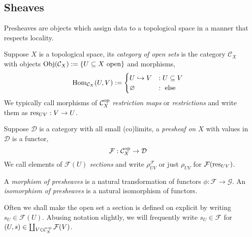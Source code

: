 \documentclass[000-main.tex]{subfiles}
\begin{document}
\subsection{Sheaves}%
\label{sec:sheaves}

Presheaves are objects which assign data to a topological space in a manner that respects locality.
\begin{definition}
  Suppose $X$ is a topological space, its \emph{category of open sets} is the category $\mathcal{C}_X$ with objects $\operatorname{Obj}(\mathcal{C}_X) := \{U \subseteq X \text{ open}\}$ and morphisms,
  \begin{displaymath}
    \operatorname{Hom}_{\mathcal{C}_X}(U, V) :=
    \begin{cases}
      U \hookrightarrow V &: U \subseteq V\\
      \varnothing &: \text{ else}
    \end{cases}
  \end{displaymath}
  We typically call morphisms of $\mathcal{C}_X^{\text{op}}$ \emph{restriction maps} or \emph{restrictions} and write them as $\operatorname{res}_{UV}: V\to U$.
\end{definition}
\begin{definition}
  Suppose $\mathcal{D}$ is a category with all small (co)limits, a \emph{presheaf on $X$} with values in $\mathcal{D}$ is a functor,
  \begin{displaymath}
    \mathcal{F}: \mathcal{C}_X^{\text{op}} \to \mathcal{D}
  \end{displaymath}
  We call elements of $\mathcal{F}(U)$ \emph{sections} and write $\rho^{\mathcal{F}}_{UV}$ or just $\rho_{UV}$ for $\mathcal{F}(\operatorname{res}_{UV})$.

  A \emph{morphism of presheaves} is a natural transformation of functors $\phi: \mathcal{F}\to \mathcal{G}$.
  An \emph{isomorphism of presheaves} is a natural isomorphism of functors.
\end{definition}
Often we shall make the open set a section is defined on explicit by writing $s_U\in \mathcal{F}(U)$.
Abusing notation slightly, we will frequently write $s_U \in \mathcal{F}$ for $(U, s)\in \coprod_{V\in \mathcal{C}_X^{\text{op}}}\mathcal{F}(V)$.
\end{document}
